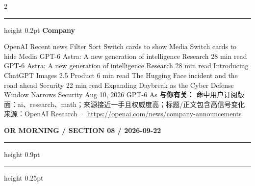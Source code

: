 \documentclass[10.5pt]{ctexart}
\begin{document}
\begin{multicols}{2}
\vspace{2mm}
\hrule height 0.2pt
\vspace{2mm}
{\large\bfseries Company}\par
OpenAI Recent news Filter Sort Switch cards to show Media Switch cards to hide Media GPT-6 Astra: A new generation of intelligence Research 28 min read GPT-6 Astra: A new generation of intelligence Research 28 min read Introducing ChatGPT Images 2.5 Product 6 min read The Hugging Face incident and the road ahead Security 22 min read Expanding Daybreak as the Cyber Defense Window Narrows Security Aug 10, 2026 GPT-6 As
\textbf{与你有关：} 命中用户订阅版面：ai、research、math；来源接近一手且权威度高；标题/正文包含高信号变化
{\footnotesize\color{ormuted} 来源：OpenAI Research · \url{https://openai.com/news/company-announcements}}
\end{multicols}
\newpage
{\small\bfseries OR MORNING / SECTION 08 / 2026-09-22}
\vspace{2mm}
\hrule height 0.9pt
\vspace{1.5mm}
\hrule height 0.25pt
\vspace{4mm}
\end{document}
